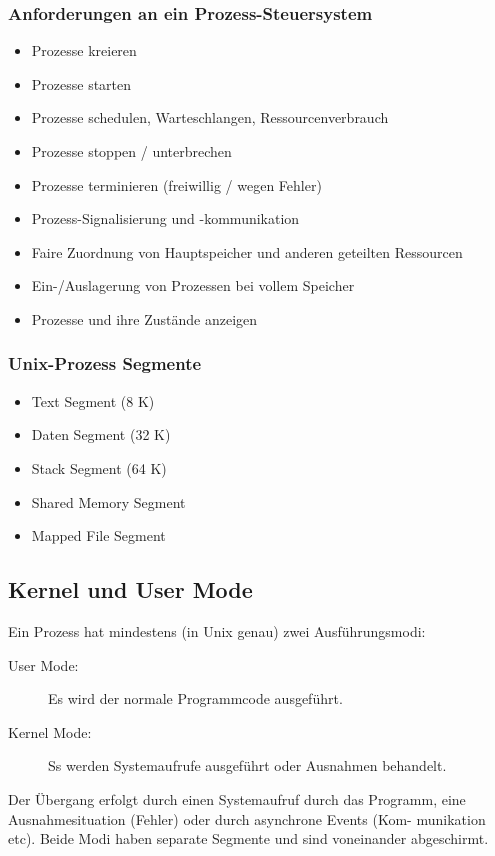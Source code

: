 \documentclass[a4paper, 10pt]{article}
\begin{document}
\subsubsection{Anforderungen an ein Prozess-Steuersystem}
\begin{itemize}
	\item Prozesse kreieren
	\item Prozesse starten
	\item Prozesse schedulen, Warteschlangen, Ressourcenverbrauch
	\item Prozesse stoppen / unterbrechen
	\item Prozesse terminieren (freiwillig / wegen Fehler)
	\item Prozess-Signalisierung und -kommunikation
	\item Faire Zuordnung von Hauptspeicher und anderen geteilten Ressourcen
	\item Ein-/Auslagerung von Prozessen bei vollem Speicher
	\item Prozesse und ihre Zustände anzeigen
\end{itemize}

\subsubsection{Unix-Prozess Segmente}
\begin{itemize}
	\item Text Segment (8 K)
	\item Daten Segment (32 K)
	\item Stack Segment (64 K)
	\item Shared Memory Segment
	\item Mapped File Segment
\end{itemize}

\subsection{Kernel und User Mode}
Ein Prozess hat mindestens (in Unix genau) zwei Ausführungsmodi:
\begin{description}
	\item[User Mode:] Es wird der normale Programmcode ausgeführt.
	\item[Kernel Mode:] Ss werden Systemaufrufe ausgeführt oder Ausnahmen behandelt.
\end{description}
Der Übergang erfolgt durch einen Systemaufruf durch das Programm, eine Ausnahmesituation (Fehler) oder durch asynchrone Events (Kom- munikation etc). Beide Modi haben separate Segmente und sind voneinander abgeschirmt.
\end{document}

